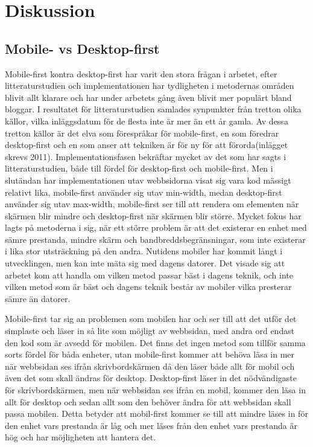 \documentclass[11pt]{article}
\begin{document}
\section{Diskussion}
\subsection{Mobile- vs Desktop-first}
Mobile-first kontra desktop-first har varit den stora frågan i arbetet, efter litteraturstudien och implementationen har tydligheten i metodernas områden blivit allt klarare och har under arbetets gång även blivit mer populärt bland bloggar. I resultatet för litteraturstudien samlades synpunkter från tretton olika källor, vilka inläggsdatum för de flesta inte är mer än ett år gamla. Av dessa tretton källor är det elva som förespråkar för mobile-first, en som föredrar desktop-first och en som anser att tekniken är för ny för att förorda(inlägget skrevs 2011). Implementationsfasen bekräftar mycket av det som har sagts i litteraturstudien, både till fördel för desktop-first och mobile-first. Men i slutändan har implementationen utav webbsidorna visat sig vara kod mässigt relativt lika, mobile-first använder sig utav min-width, medan desktop-first använder sig utav max-width, mobile-first ser till att rendera om elementen när skärmen blir mindre och desktop-first när skärmen blir större. Mycket fokus har lagts på metoderna i sig, när ett större problem är att det existerar en enhet med sämre prestanda, mindre skärm och bandbreddsbegränsningar, som inte existerar i lika stor utsträckning på den andra. Nutidens mobiler har kommit långt i utvecklingen, men kan inte mäta sig med dagens datorer. Det visade sig att arbetet kom att handla om vilken metod passar bäst i dagens teknik, och inte vilken metod som är bäst och dagens teknik består av mobiler vilka presterar sämre än datorer. 

Mobile-first tar sig an problemen som mobilen har och ser till att det utför det simplaste och läser in så lite som möjligt av webbsidan, med andra ord endast den kod som är avsedd för mobilen. Det finns det ingen metod som tillför samma sorts fördel för båda enheter, utan mobile-first kommer att behöva läsa in mer när webbsidan ses ifrån skrivbordskärmen då den läser både allt för mobil och även det som skall ändras för desktop. Desktop-first läser in det nödvändigaste för skrivbordskärmen, men när webbsidan ses ifrån en mobil, kommer den läsa in allt för desktop och sedan allt som den behöver ändra för att webbsidan skall passa mobilen. Detta betyder att mobil-first kommer se till att mindre läses in för den enhet vars prestanda är låg och mer läses från den enhet vars prestanda är hög och har möjligheten att hantera det.
\end{document}
